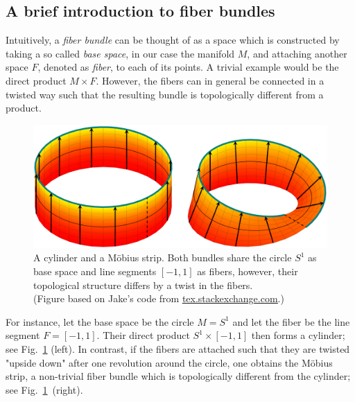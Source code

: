 

\subsection{A brief introduction to fiber bundles}
\label{sec:fiber_bundles_general}


Intuitively, a \emph{fiber bundle} can be thought of as a space which is constructed by taking a so called \emph{base space}, in our case the manifold $M$, and attaching another space $F$, denoted as \emph{fiber}, to each of its points.
A trivial example would be the direct product \mbox{$M\times F$}.
However, the fibers can in general be connected in a twisted way such that the resulting bundle is topologically different from a product.
\begin{figure}
    \vspace*{-1.4ex}
    \hfill
    \includegraphics[width=.98\linewidth]{figures/moebius.png}%
    \vspace*{.2ex}
    \caption{\small
        A cylinder and a M{\"o}bius strip.
        Both bundles share the circle $S^1$ as base space and line segments $[-1,1]$ as fibers, however, their topological structure differs by a twist in the fibers.
        {\\
            \color{gray}
            \scriptsize
            (Figure based on Jake's code from
            \href{https://tex.stackexchange.com/questions/118563/moebius-strip-using-tikz}{\underline{tex.stackexchange.com}}.)
        }
        }
    \label{fig:moebius}
\end{figure}%
For instance, let the base space be the circle $M=S^1$ and let the fiber be the line segment $F=[-1,1]$.
Their direct product $S^1\times[-1,1]$ then forms a cylinder; see Fig.~\ref{fig:moebius} (left).
In contrast, if the fibers are attached such that they are twisted "upside down" after one revolution around the circle, one obtains the M{\"o}bius strip, a non-trivial fiber bundle which is topologically different from the cylinder; see Fig.~\ref{fig:moebius}~(right).%
